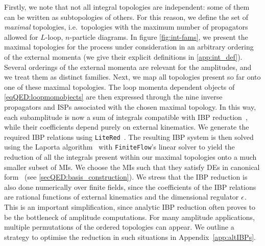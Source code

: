 \documentclass[main.tex]{subfiles}
\begin{document}
Firstly, we note that not all integral topologies are independent: some of them
can be written as subtopologies of others. For this reason, we define the set
of \textit{maximal} topologies, i.e.~topologies with the maximum number of
propagators allowed for $L$-loop, $n$-particle diagrams.  In figure
\ref{fig:int-fams}, we present the maximal topologies for the process under
consideration in an arbitrary ordering of the external momenta (we give their
explicit definitions in \cref{app:int_def}). Several orderings of the external
momenta are relevant for the amplitudes, and we treat them as distinct
families. Next, we map all topologies present so far onto one of these maximal
topologies. The loop momenta dependent objects of \cref{eqQED:loopmomobjects} are
then expressed through the nine inverse propagators and ISPs associated
with the chosen maximal topology. In this way, each subamplitude is now a sum
of integrals compatible with IBP
reduction~\cite{Tkachov:1981wb,Chetyrkin:1981qh}, while their coefficients
depend purely on external kinematics. We generate the required IBP
relations using \texttt{LiteRed}~\cite{Lee:2012cn}. The resulting IBP
system is then solved using the Laporta algorithm~\cite{Laporta:2001dd} with
\texttt{FiniteFlow}'s linear solver to yield the reduction of all the integrals
present within our maximal topologies onto a much smaller subset of MIs.
We choose the MIs such that they satisfy DEs in canonical
form~\cite{Henn:2013pwa} (see \cref{secQED:basis_construction}). We stress that
the IBP reduction is also done numerically over finite fields, since the
coefficients of the IBP relations are rational functions of external
kinematics and the dimensional regulator $\epsilon$. This is an important
simplification, since analytic IBP reduction often proves to be the
bottleneck of amplitude computations. For many amplitude applications, multiple permutations of the ordered topologies can appear. We outline a strategy to optimise the reduction in such situations in Appendix~\ref{app:altIBPs}.
\end{document}
